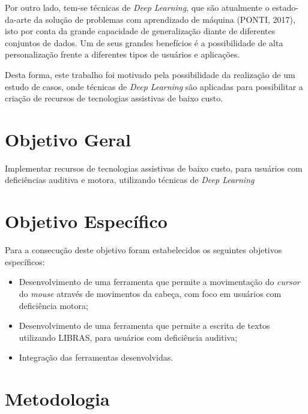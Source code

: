 \par Por outro lado, tem-se técnicas de \textit{Deep Learning}, que são atualmente o estado-da-arte da solução de problemas com aprendizado de máquina (PONTI, 2017), isto por conta da grande capacidade de generalização diante de diferentes conjuntos de dados. Um de seus grandes benefícios é a possibilidade de alta personalização frente a diferentes tipos de usuários e aplicações.

\par Desta forma, este trabalho foi motivado pela possibilidade da realização de um estudo de casos, onde técnicas de \textit{Deep Learning} são aplicadas para possibilitar a criação de recursos de tecnologias assistivas de baixo custo.

\section{Objetivo Geral} %

\par Implementar recursos de tecnologias assistivas de baixo custo, para usuários com deficiências auditiva e motora, utilizando técnicas de \textit{Deep Learning}

\section{Objetivo Espec\'ifico}

\par Para a consecução deste objetivo foram estabelecidos os seguintes objetivos específicos:

\begin{itemize}
    \item Desenvolvimento de uma ferramenta que permite a movimentação do \textit{cursor} do \textit{mouse} através de movimentos da cabeça, com foco em usuários com deficiência motora;
    \item Desenvolvimento de uma ferramenta que permite a escrita de textos utilizando LIBRAS, para usuários com deficiência auditiva;
    \item Integração das ferramentas desenvolvidas.
\end{itemize}

\section{Metodologia} %

